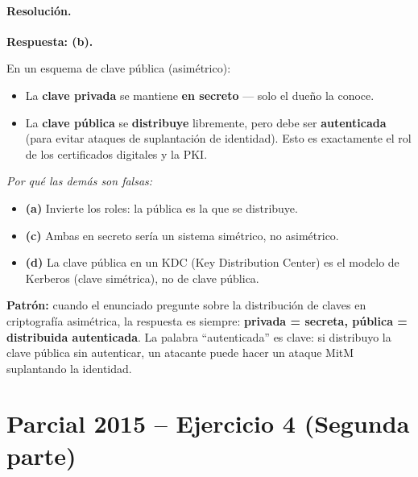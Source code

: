 \documentclass[11pt,a4paper]{article}
\begin{document}
\paragraph{Resolución.}

\textbf{Respuesta: (b).}

En un esquema de clave pública (asimétrico):
\begin{itemize}
  \item La \textbf{clave privada} se mantiene \textbf{en secreto} --- solo el dueño la conoce.
  \item La \textbf{clave pública} se \textbf{distribuye} libremente, pero debe ser \textbf{autenticada} (para evitar ataques de suplantación de identidad). Esto es exactamente el rol de los certificados digitales y la PKI.
\end{itemize}

\emph{Por qué las demás son falsas:}
\begin{itemize}
  \item \textbf{(a)} Invierte los roles: la pública es la que se distribuye.
  \item \textbf{(c)} Ambas en secreto sería un sistema simétrico, no asimétrico.
  \item \textbf{(d)} La clave pública en un KDC (Key Distribution Center) es el modelo de Kerberos (clave simétrica), no de clave pública.
\end{itemize}

\begin{tipsbox}
\textbf{Patrón:} cuando el enunciado pregunte sobre la distribución de claves en criptografía asimétrica, la respuesta es siempre: \textbf{privada = secreta, pública = distribuida autenticada}. La palabra ``autenticada'' es clave: si distribuyo la clave pública sin autenticar, un atacante puede hacer un ataque MitM suplantando la identidad.
\end{tipsbox}

\section{Parcial 2015 -- Ejercicio 4 (Segunda parte)}
\label{sec:rsa2015b}
\end{document}
